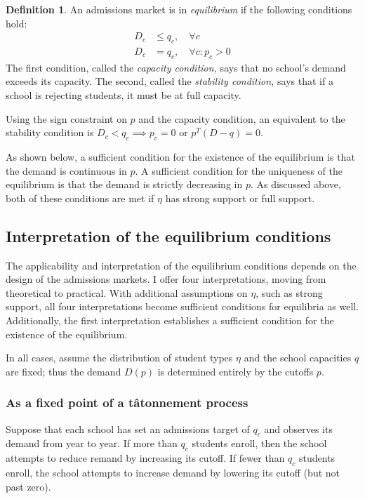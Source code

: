 \documentclass[12pt]{article}
\theoremstyle{definition}
\newtheorem{definition}{Definition}
\begin{document}
\begin{definition} \label{marketeqconditions} An admissions market is in \emph{equilibrium} if the following conditions hold:
\begin{align} D_c &\leq q_c, \quad \forall c \label{capacitycondition} \\
D_c &= q_c, \quad \forall c: p_c > 0 \label{stabilitycondition}
\end{align}
The first condition, called the \emph{capacity condition,} says that no school's demand exceeds its capacity. The second, called the \emph{stability condition,} says that if a school is rejecting students, it must be at full capacity.
\end{definition}

Using the sign constraint on $p$ and the capacity condition, an equivalent to the stability condition is $D_c < q_c \implies p_c = 0$ or $p^T \left(D - q\right) = 0$.

As shown below, a sufficient condition for the existence of the equilibrium is that the demand is continuous in $p$. A sufficient condition for the uniqueness of the equilibrium is that the demand is strictly decreasing in $p$. As discussed above, both of these conditions are met if $\eta$ has strong support or full support. 

\subsection{Interpretation of the equilibrium conditions}
The applicability and interpretation of the equilibrium conditions depends on the design of the admissions markets. I offer four interpretations, moving from theoretical to practical. With additional assumptions on $\eta$, such as strong support, all four interpretations become sufficient conditions for equilibria as well. Additionally, the first interpretation establishes a sufficient condition for the existence of the equilibrium. 

In all cases, assume the distribution of student types $\eta$ and the school capacities $q$ are fixed; thus the demand $D(p)$ is determined entirely by the cutoffs $p$. 

\subsubsection{As a fixed point of a t\^{a}tonnement process} \label{asafixedpoint}
Suppose that each school has set an admissions target of $q_c$ and observes its demand from year to year. If more than $q_c$ students enroll, then the school attempts to reduce remand by increasing its cutoff. If fewer than $q_c$ students enroll, the school attempts to increase demand by lowering its cutoff (but not past zero). 
\end{document}
